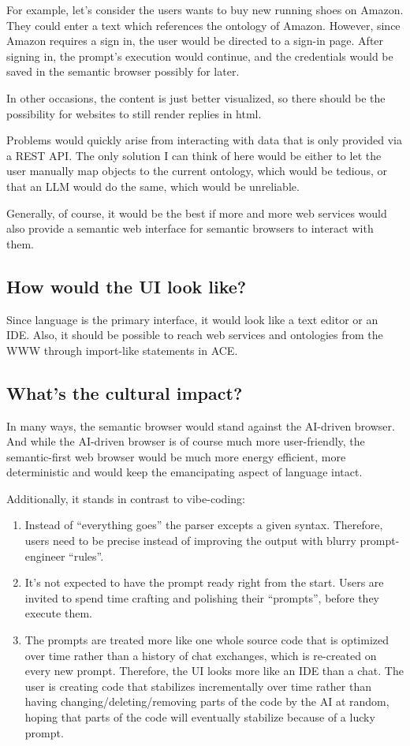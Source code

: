 \documentclass[12pt,a4paper]{article}
\begin{document}
For example, let's consider the users wants to buy new running shoes on Amazon. They could enter a text which references the ontology of Amazon. However, since Amazon requires a sign in, the user would be directed to a sign-in page. After signing in, the prompt's execution would continue, and the credentials would be saved in the semantic browser possibly for later.

In other occasions, the content is just better visualized, so there should be the possibility for websites to still render replies in html.

Problems would quickly arise from interacting with data that is only provided via a REST API. The only solution I can think of here would be either to let the user manually map objects to the current ontology, which would be tedious, or that an LLM would do the same, which would be unreliable.

Generally, of course, it would be the best if more and more web services would also provide a semantic web interface for semantic browsers to interact with them.

\subsection{How would the UI look like?}

Since language is the primary interface, it would look like a text editor or an IDE. Also, it should be possible to reach web services and ontologies from the WWW through import-like statements in ACE.

\subsection{What's the cultural impact?}

In many ways, the semantic browser would stand against the AI-driven browser. And while the AI-driven browser is of course much more user-friendly, the semantic-first web browser would be much more energy efficient, more deterministic and would keep the emancipating aspect of language intact.

Additionally, it stands in contrast to vibe-coding:

\begin{enumerate}
    \item Instead of ``everything goes'' the parser excepts a given syntax. Therefore, users need to be precise instead of improving the output with blurry prompt-engineer ``rules''.
    \item It's not expected to have the prompt ready right from the start. Users are invited to spend time crafting and polishing their ``prompts'', before they execute them.
    \item The prompts are treated more like one whole source code that is optimized over time rather than a history of chat exchanges, which is re-created on every new prompt. Therefore, the UI looks more like an IDE than a chat. The user is creating code that stabilizes incrementally over time rather than having changing/deleting/removing parts of the code by the AI at random, hoping that parts of the code will eventually stabilize because of a lucky prompt.
\end{enumerate}
\end{document}

